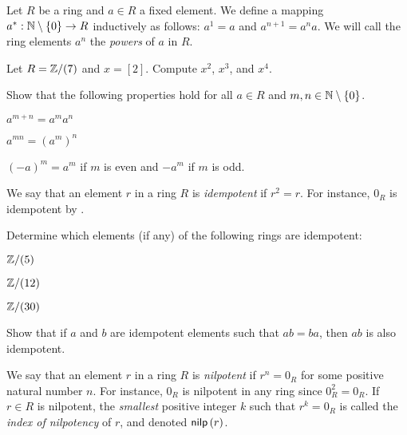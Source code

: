 \begin{dfn} \label{dfn:pow-elt}
Let \(R\) be a ring and \(a \in R\) a fixed element. We define a mapping \(a^\ast : \mathbb{N} \setminus \{0\} \rightarrow R\) inductively as follows: \(a^1 = a\) and \(a^{n+1} = a^n a\). We will call the ring elements \(a^n\) the \emph{powers} of \(a\) in \(R\).
\end{dfn}

\begin{exercise}
Let \(R = \mathbb{Z}/(7)\) and \(x = [2]\). Compute \(x^2\), \(x^3\), and \(x^4\).
\end{exercise}

\begin{exercise}
Show that the following properties hold for all \(a \in R\) and \(m,n \in \mathbb{N} \setminus \{0\}\). \label{exerc:ring-powers}
\begin{proplist}
\item \(a^{m+n} = a^m a^n\)
\item \(a^{mn} = (a^m)^n\)
\item \((-a)^m = a^m\) if \(m\) is even and \(-a^m\) if \(m\) is odd.
\end{proplist}
\end{exercise}

\begin{dfn}[Idempotent] \label{dfn:idempotent}
We say that an element \(r\) in a ring \(R\) is \emph{idempotent}  if \(r^2 = r\). For instance, \(0_R\) is idempotent by .
\end{dfn}

\begin{exercise}
Determine which elements (if any) of the following rings are idempotent:
\begin{proplist*}
\item \(\mathbb{Z}/(5)\)
\item \(\mathbb{Z}/(12)\)
\item \(\mathbb{Z}/(30)\)
\end{proplist*}
\end{exercise}

\begin{exercise}
Show that if \(a\) and \(b\) are idempotent elements such that \(ab = ba\), then \(ab\) is also idempotent.
\end{exercise}

\begin{dfn}[Nilpotent] \label{dfn:nilpotent}
We say that an element \(r\) in a ring \(R\) is \emph{nilpotent}  if \(r^n = 0_R\) for some positive natural number \(n\). For instance, \(0_R\) is nilpotent in any ring since \(0_R^2 = 0_R\). If \(r \in R\) is nilpotent, the \emph{smallest} positive integer \(k\) such that \(r^k = 0_R\) is called the \emph{index of nilpotency} of \(r\), and denoted \(\mathsf{nilp}\left(r\right)\).
\end{dfn}

